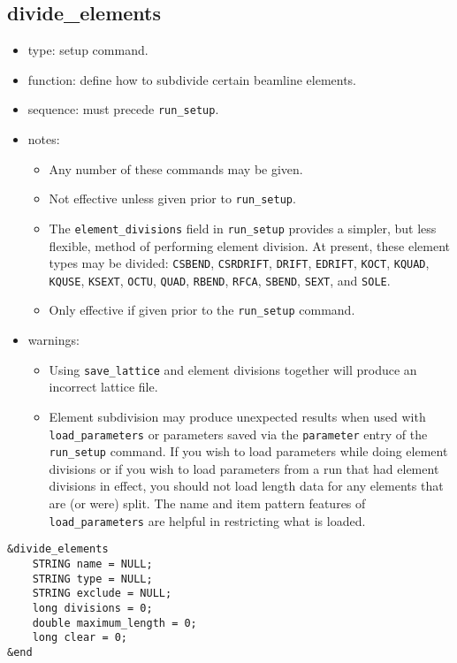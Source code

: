 \documentclass[11pt]{article}
\begin{document}
\subsection{divide\_elements \label{subsec:divideelements}}

\begin{itemize}
\item type: setup command.
\item function: define how to subdivide certain beamline elements.
\item sequence: must precede \verb|run_setup|.
\item notes: 
	\begin{itemize}
	\item Any number of these commands may be given.  
	\item Not effective unless given prior to \verb|run_setup|.
	\item The \verb|element_divisions|
 field in \verb|run_setup| provides a simpler, but less flexible, method of performing
 element division.  At present, these element types may be divided: 
\verb|CSBEND|, 
\verb|CSRDRIFT|,
\verb|DRIFT|,
\verb|EDRIFT|,
\verb|KOCT|,
\verb|KQUAD|,
\verb|KQUSE|,
\verb|KSEXT|,
\verb|OCTU|,
\verb|QUAD|,
\verb|RBEND|,
\verb|RFCA|,
\verb|SBEND|,
\verb|SEXT|,
and \verb|SOLE|.
	\item Only effective if given prior to the \verb|run_setup| command.
	\end{itemize}
\item warnings:	
	\begin{itemize}
	\item Using \verb|save_lattice| and element divisions together will
	produce an incorrect lattice file.
	\item Element subdivision may
	produce unexpected results when used with \verb|load_parameters|
	or parameters saved via the \verb|parameter|
	entry of the \verb|run_setup| command.
	If you wish to load parameters while doing element divisions or if
	you wish to load parameters from a run that had element divisions
	in effect, you should not load length data for any elements that
	are (or were) split.  The name and item pattern features of 
	\verb|load_parameters| are helpful in restricting what is loaded.
	\end{itemize}
\end{itemize}

\begin{verbatim}
&divide_elements
    STRING name = NULL;
    STRING type = NULL;
    STRING exclude = NULL;
    long divisions = 0;
    double maximum_length = 0;
    long clear = 0;
&end
\end{verbatim}
\end{document}
